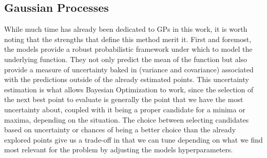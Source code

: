 \subsection{Gaussian Processes}
While much time has already been dedicated to GPs in this work, it is worth noting that the strengths that define this method merit it. First and foremost, the models provide a robust probabilistic framework under which to model the underlying function. They not only predict the mean of the function but also provide a measure of uncertainty baked in (variance and covariance) associated with the predictions outside of the already estimated points. This uncertainty estimation is what allows Bayesian Optimization to work, since the selection of the next best point to evaluate is generally the point that we have the most uncertainty about, coupled with it being a proper candidate for a minima or maxima, depending on the situation. The choice between selecting candidates based on uncertainty or chances of being a better choice than the already explored points give us a trade-off in that we can tune depending on what we find most relevant for the problem by adjusting the models hyperparameters. 

